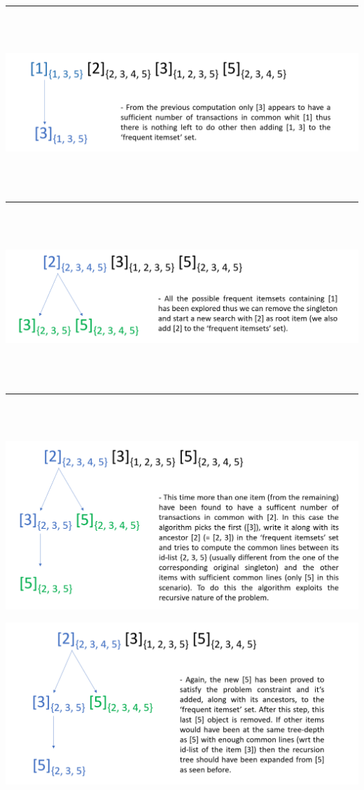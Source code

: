 \documentclass[]{report}
\begin{document}
	\rule{\textwidth}{0.4pt}
	\\\\
	\centerline{\includegraphics[scale=0.5]{./img/alg3}}
	\\\\
	\rule{\textwidth}{0.4pt}
	\\\\
	\centerline{\includegraphics[scale=0.5]{./img/alg4}}
	\\\\
	\rule{\textwidth}{0.4pt}
	\\\\
	\centerline{\includegraphics[scale=0.5]{./img/alg5}}

	\centerline{\includegraphics[scale=0.5]{./img/alg6}}
	
\end{document}
